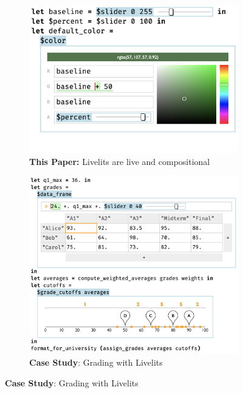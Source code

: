 \begin{figure}
\begin{minipage}[t]{0.38\textwidth}
    \begin{subfigure}[t]{\linewidth}
     \begin{snugshade}
      \vspace*{-2mm}
      \caption{\textbf{This Paper:} Livelits are live and compositional}
      \vspace*{1mm}
     \end{snugshade}
      \vspace*{1.5mm}
      \includegraphics[width=\linewidth]{slider-color-livelits.png}
    \end{subfigure}
  \end{minipage}
  \hspace{3mm}
  \begin{subfigure}[t]{0.585\textwidth}
  \begin{snugshade}
   \vspace*{-2mm}
    \caption{\textbf{Case Study}: Grading with Livelits}
    \vspace*{1mm}
     \end{snugshade}
    \vspace*{1.5mm}
    \includegraphics[width=\linewidth]{grade-cutoff-livelit.png}

\end{subfigure}
\end{figure}
